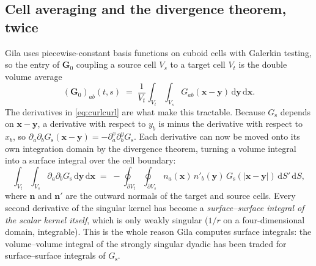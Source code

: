 \documentclass[11pt]{article}
\theoremstyle{remark}
\newcommand{\dd}{\mathrm{d}}
\newcommand{\Gs}{G_{\mathrm{s}}}
\begin{document}
\subsection{Cell averaging and the divergence theorem, twice}

Gila uses piecewise-constant basis functions on cuboid cells with Galerkin testing,
so the entry of $\mathbf{G}_0$ coupling a source cell $V_s$ to a target cell $V_t$
is the double volume average
\begin{equation}
(\mathbf{G}_0)_{ab}(t,s) \;=\; \frac{1}{V_t}\int_{V_t}\!\int_{V_s}
G_{ab}(\mathbf{x}-\mathbf{y})\,\dd\mathbf{y}\,\dd\mathbf{x}.
\label{eq:cellavg}
\end{equation}
The derivatives in \eqref{eq:curlcurl} are what make this tractable. Because $\Gs$
depends on $\mathbf{x}-\mathbf{y}$, a derivative with respect to $y_b$ is minus the
derivative with respect to $x_b$, so
$\partial_a\partial_b\Gs(\mathbf{x}-\mathbf{y}) = -\partial^{x}_a\partial^{y}_b\Gs$.
Each derivative can now be moved onto its own integration domain by the divergence
theorem, turning a volume integral into a surface integral over the cell boundary:
\begin{equation}
\int_{V_t}\!\int_{V_s}\partial_a\partial_b\Gs\,\dd\mathbf{y}\,\dd\mathbf{x}
\;=\; -\oint_{\partial V_t}\!\oint_{\partial V_s} n_a(\mathbf{x})\,n'_b(\mathbf{y})\,
\Gs(|\mathbf{x}-\mathbf{y}|)\,\dd S'\,\dd S,
\label{eq:divdiv}
\end{equation}
where $\mathbf{n}$ and $\mathbf{n}'$ are the outward normals of the target and source
cells. Every second derivative of the singular kernel has become a
\emph{surface--surface integral of the scalar kernel itself}, which is only weakly
singular ($1/r$ on a four-dimensional domain, integrable). This is the whole reason
Gila computes surface integrals: the volume--volume integral of the strongly singular
dyadic has been traded for surface--surface integrals of $\Gs$.
\end{document}
